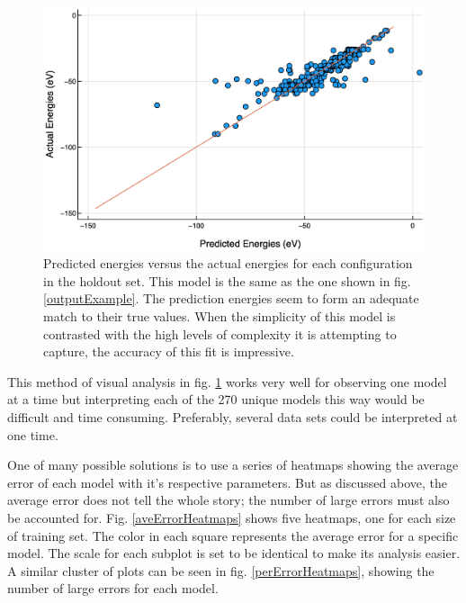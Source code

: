 \begin{figure}%
\centering
\includegraphics[scale = 0.5]{Figures/accuracyPlot}
\caption{Predicted energies versus the actual energies for each configuration in the holdout set. This model is the same as the one shown in fig. \ref{outputExample}. The prediction energies seem to form an adequate match to their true values. When the simplicity of this model is contrasted with the high levels of complexity it is attempting to capture, the accuracy of this fit is impressive.
\label{accuracyPlot}} 
\end{figure}

\par This method of visual analysis in fig. \ref{accuracyPlot} works very well for observing one model at a time but interpreting each of the 270 unique models this way would be difficult and time consuming. Preferably, several data sets could be interpreted at one time.
\par One of many possible solutions is to use a series of heatmaps showing the average error of each model with it's respective parameters. But as discussed above, the average error does not tell the whole story; the number of large errors must also be accounted for. Fig. \ref{aveErrorHeatmaps} shows five heatmaps, one for each size of training set. The color in each square represents the average error for a specific model. The scale for each subplot is set to be identical to make its analysis easier. A similar cluster of plots can be seen in fig. \ref{perErrorHeatmaps}, showing the number of large errors for each model. 

